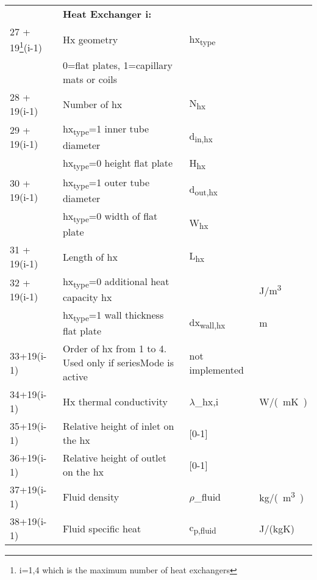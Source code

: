 \documentclass[english]{SPFReport}
\begin{document}
\begin{tabular}{| l |  m{8cm} | l | l |}
\hline
     & \textbf{Heat Exchanger i:} & & \\
  \small{ 27 + 19\footnote{i=1,4 which is the maximum number of heat exchangers}(i-1) } &Hx geometry & \si{hx_{type}}& \\  
   &0=flat plates, 1=capillary mats or coils &&\\
  \small{ 28 + 19(i-1)}& Number of hx & \si{N_{hx}} & \\  
  \small{ 29 + 19(i-1)}& \si{hx_{type}}=1  inner tube diameter & \si{d_{in,hx}} & \\  
                           & \si{hx_{type}}=0 height flat plate & \si{H_{hx}}& \\  
  \small{ 30 + 19(i-1)}& \si{hx_{type}}=1 outer tube diameter &\si{d_{out,hx}}& \\  
                           & \si{hx_{type}}=0  width of flat plate &\si{W_{hx}}& \\  
  \small{ 31 + 19(i-1)}& Length of hx  & \si{L_{hx}} & \\  
  \small{ 32 + 19(i-1)}& \si{hx_{type}}=0  additional heat capacity hx & & \si{J/m^3} \\  
                           & \si{hx_{type}}=1  wall thickness flat plate &\si{dx_{wall,hx}} & m \\  
  \small{33+19(i-1)}& Order of hx from 1 to 4. Used only if seriesMode is active  & not implemented & \\  
  \small{34+19(i-1)}& Hx thermal conductivity  & \si{$\lambda$_{hx,i}} & \si{W/(mK)}\\
  \small{35+19(i-1)}& Relative height of inlet on the hx & [0-1] &  \\
   \small{36+19(i-1)}& Relative height of outlet on the hx & [0-1] &  \\
 
   \small{37+19(i-1)}& Fluid density & \si{$\rho$_{fluid}} & \si{kg/(m^3)} \\
   \small{38+19(i-1)}& Fluid specific heat & \si{c_{p,fluid}} & J/(kgK) \\
   

\end{tabular}
\end{document}
